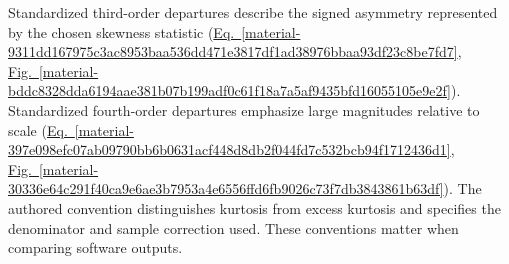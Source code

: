 \documentclass[11pt,a4paper]{article}
\begin{document}
Standardized third-order departures describe the signed asymmetry represented by the chosen skewness statistic (\hyperref[material-9311dd167975c3ac8953baa536dd471e3817df1ad38976bbaa93df23c8be7fd7]{Eq.~\ref*{material-9311dd167975c3ac8953baa536dd471e3817df1ad38976bbaa93df23c8be7fd7}}, \hyperref[material-bddc8328dda6194aae381b07b199adf0c61f18a7a5af9435bfd16055105e9e2f]{Fig.~\ref*{material-bddc8328dda6194aae381b07b199adf0c61f18a7a5af9435bfd16055105e9e2f}}). Standardized fourth-order departures emphasize large magnitudes relative to scale (\hyperref[material-397e098efc07ab09790bb6b0631acf448d8db2f044fd7c532bcb94f1712436d1]{Eq.~\ref*{material-397e098efc07ab09790bb6b0631acf448d8db2f044fd7c532bcb94f1712436d1}}, \hyperref[material-30336e64c291f40ca9e6ae3b7953a4e6556ffd6fb9026c73f7db3843861b63df]{Fig.~\ref*{material-30336e64c291f40ca9e6ae3b7953a4e6556ffd6fb9026c73f7db3843861b63df}}). The authored convention distinguishes kurtosis from excess kurtosis and specifies the denominator and sample correction used. These conventions matter when comparing software outputs.
\end{document}
